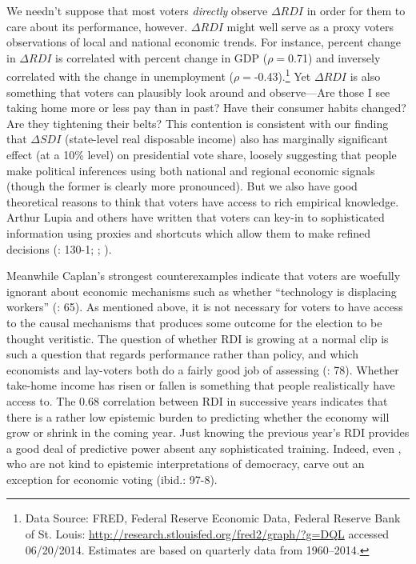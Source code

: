 \documentclass[11pt]{article}
\begin{document}
We needn't suppose that most voters \emph{directly} observe $\Delta
RDI$ in order for them to care about its performance, however. $\Delta RDI$ might well serve as
a proxy voters observations of local and national economic
trends. For instance, percent change in $\Delta
RDI$ is correlated with percent change in GDP
($\rho=$0.71) and inversely correlated with the change in  unemployment
($\rho=$-0.43).\footnote{Data Source: FRED, Federal Reserve Economic
  Data, Federal Reserve Bank of St. Louis:
  \url{http://research.stlouisfed.org/fred2/graph/?g=DQL} accessed
  06/20/2014. Estimates are based on quarterly data from 1960--2014.}
 Yet $\Delta RDI$ is also something that voters can plausibly look around and
observe---Are those I see taking home more or less pay than in past?
Have their consumer habits changed? Are they tightening their belts? This contention is consistent with our finding that $\Delta SDI$ (state-level real disposable income) also has marginally significant effect (at a 10\% level) on presidential vote share, loosely suggesting that people make political inferences using both national and regional economic signals (though the former is clearly more pronounced).
But we also have good theoretical reasons to think that voters
have access to rich empirical knowledge. Arthur Lupia and others have written
that voters can key-in to sophisticated information using proxies
and shortcuts which allow them to make refined decisions (\citet{Kinder1981}: 130-1; \citet{Lupia2000};
\citet{Lupia2006}).

Meanwhile Caplan's strongest counterexamples  indicate that voters are woefully ignorant about economic mechanisms such as whether ``technology is displacing workers'' (\cite{Caplan2006}: 65). As mentioned above, it is not necessary for voters to have access to the causal mechanisms that produces some outcome for the election to be thought veritistic. The question of whether RDI is growing at a normal clip is such a question that regards performance rather than policy, and which economists and lay-voters both do a fairly good job of assessing (\cite{Caplan2006}: 78). Whether take-home income has risen or fallen is something that people realistically have access to. The 0.68 correlation between RDI in successive years indicates that there is a rather low epistemic burden to predicting whether the economy will grow or shrink in the coming year. Just knowing the previous year's RDI provides a good deal of predictive power absent any sophisticated training. Indeed, even \cite{achen2016democracy}, who are not kind to epistemic interpretations of democracy, carve out an exception for economic voting (ibid.: 97-8).
\end{document}
